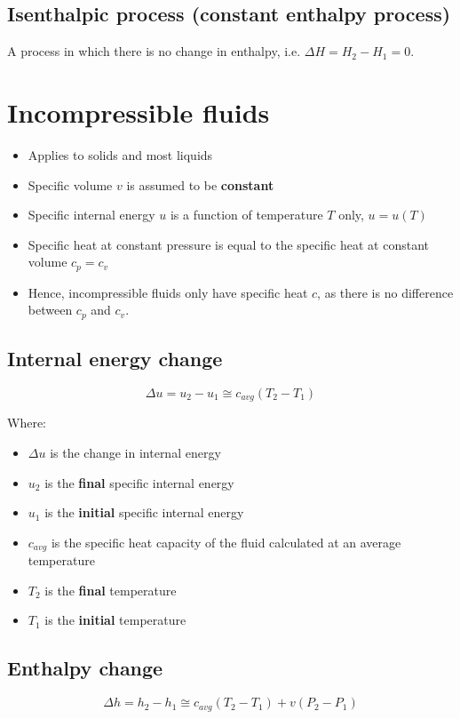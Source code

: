\documentclass[11pt]{article}
\begin{document}
\subsection{Isenthalpic process (constant enthalpy process)}
\label{sec:org30f84be}
A process in which there is no change in enthalpy, i.e. \(\Delta H = H_2 - H_1 = 0\).

\newpage
\section{Incompressible fluids}
\label{sec:org8bb653c}
\begin{itemize}
\item Applies to solids and most liquids
\item Specific volume \(v\) is assumed to be \textbf{constant}
\item Specific internal energy \(u\) is a function of temperature \(T\) only, \(u = u(T)\)
\item Specific heat at constant pressure is equal to the specific heat at constant volume \(c_p = c_v\)
\item Hence, incompressible fluids only have specific heat \(c\), as there is no difference between \(c_p\) and \(c_v\).
\end{itemize}
\subsection{Internal energy change}
\label{sec:orgb17ef0f}
\[\Delta u = u_2 - u_1 \cong c_{avg} \left(T_2 - T_1 \right)\]

Where:
\begin{itemize}
\item \(\Delta u\) is the change in internal energy
\item \(u_2\) is the \textbf{final} specific internal energy
\item \(u_1\) is the \textbf{initial} specific internal energy
\item \(c_{avg}\) is the specific heat capacity of the fluid calculated at an average temperature
\item \(T_2\) is the \textbf{final} temperature
\item \(T_1\) is the \textbf{initial} temperature
\end{itemize}

\newpage
\subsection{Enthalpy change}
\label{sec:org086a0a9}
\[\Delta h = h_2 - h_1 \cong c_{avg} \left(T_2 - T_1 \right) + v \left(P_2 - P_1 \right)\]
\end{document}
